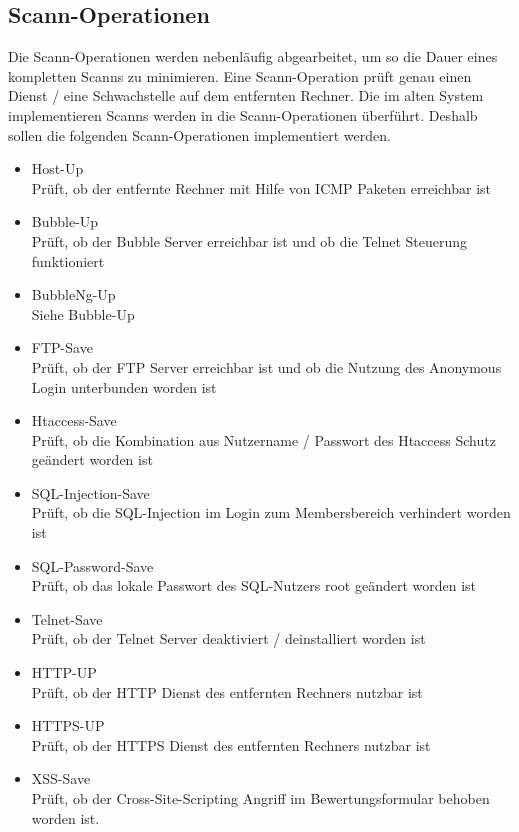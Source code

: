 \subsection{Scann-Operationen}

Die Scann-Operationen werden nebenläufig abgearbeitet, um so die Dauer eines kompletten Scanns zu minimieren. Eine Scann-Operation prüft genau einen Dienst / eine Schwachstelle auf dem entfernten Rechner. Die im alten System implementieren Scanns werden in die Scann-Operationen überführt. Deshalb sollen die folgenden Scann-Operationen implementiert werden.

\begin{itemize}
	\item Host-Up \\
	Prüft, ob der entfernte Rechner mit Hilfe von ICMP Paketen erreichbar ist
	\item Bubble-Up \\
	Prüft, ob der Bubble Server erreichbar ist und ob die Telnet Steuerung funktioniert
	\item BubbleNg-Up\\
	Siehe Bubble-Up
	\item FTP-Save\\
	Prüft, ob der FTP Server erreichbar ist und ob die Nutzung des Anonymous Login unterbunden worden ist
	\item Htaccess-Save\\
	Prüft, ob die Kombination aus Nutzername / Passwort des Htaccess Schutz geändert worden ist
	\item SQL-Injection-Save\\
	Prüft, ob die SQL-Injection im Login zum Membersbereich verhindert worden ist
	\item SQL-Password-Save\\
	Prüft, ob das lokale Passwort des SQL-Nutzers root geändert worden ist
	\item Telnet-Save\\
	Prüft, ob der Telnet Server deaktiviert / deinstalliert worden ist
	\item HTTP-UP\\
	Prüft, ob der HTTP Dienst des entfernten Rechners nutzbar ist
	\item HTTPS-UP\\
	Prüft, ob der HTTPS Dienst des entfernten Rechners nutzbar ist
	\item XSS-Save\\
	Prüft, ob der Cross-Site-Scripting Angriff im Bewertungsformular behoben worden ist.
\end{itemize}

